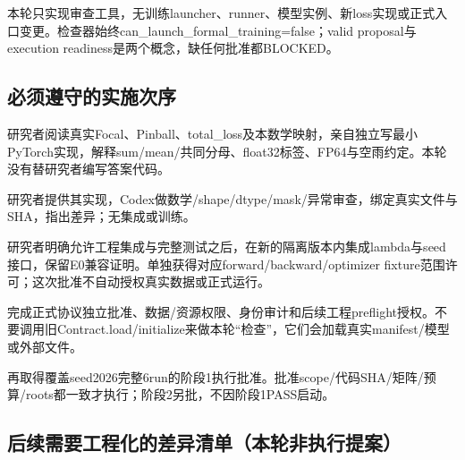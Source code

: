\documentclass[UTF8,fontset=fandol,10pt]{ctexart}
\begin{document}
本轮只实现审查工具，无训练launcher、runner、模型实例、新loss实现或正式入口变更。检查器始终can\_\allowbreak{}launch\_\allowbreak{}formal\_\allowbreak{}training=false；valid proposal与execution readiness是两个概念，缺任何批准都BLOCKED。

\subsection{必须遵守的实施次序}

\noindent\textbullet\quad 研究者阅读真实Focal、Pinball、total\_\allowbreak{}loss及本数学映射，亲自独立写最小PyTorch实现，解释sum/\allowbreak{}mean/\allowbreak{}共同分母、float32标签、FP64与空雨约定。本轮没有替研究者编写答案代码。\par
\noindent\textbullet\quad 研究者提供其实现，Codex做数学/\allowbreak{}shape/\allowbreak{}dtype/\allowbreak{}mask/\allowbreak{}异常审查，绑定真实文件与SHA，指出差异；无集成或训练。\par
\noindent\textbullet\quad 研究者明确允许工程集成与完整测试之后，在新的隔离版本内集成lambda与seed接口，保留E0兼容证明。单独获得对应forward/\allowbreak{}backward/\allowbreak{}optimizer fixture范围许可；这次批准不自动授权真实数据或正式运行。\par
\noindent\textbullet\quad 完成正式协议独立批准、数据/\allowbreak{}资源权限、身份审计和后续工程preflight授权。不要调用旧Contract.load/\allowbreak{}initialize来做本轮“检查”，它们会加载真实manifest/\allowbreak{}模型或外部文件。\par
\noindent\textbullet\quad 再取得覆盖seed2026完整6run的阶段1执行批准。批准scope/\allowbreak{}代码SHA/\allowbreak{}矩阵/\allowbreak{}预算/\allowbreak{}roots都一致才执行；阶段2另批，不因阶段1PASS启动。\par

\subsection{后续需要工程化的差异清单（本轮非执行提案）}
\end{document}
